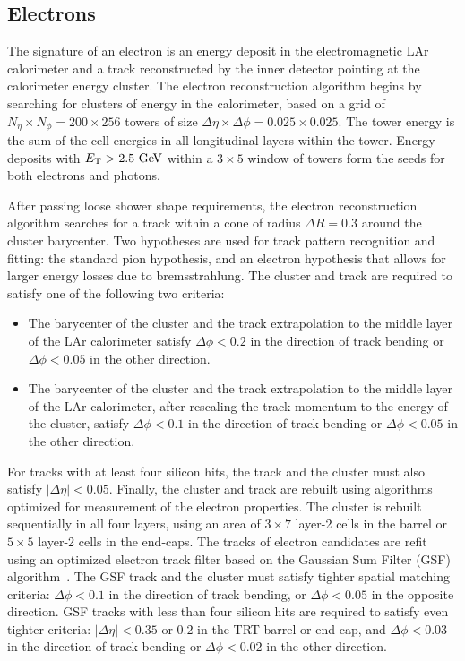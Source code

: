 \subsection{Electrons}\label{sec:event-reconstruction-electrons}
The signature of an electron is an energy deposit in the electromagnetic LAr calorimeter and a track reconstructed by the inner detector pointing at the calorimeter energy cluster.  The electron reconstruction algorithm begins by searching for clusters of energy in the calorimeter, based on a grid of $N_{\eta}\times N_{\phi}=200\times256$ towers of size $\Delta\eta\times\Delta\phi = 0.025\times0.025$. The tower energy is the sum of the cell energies in all longitudinal layers within the tower. Energy deposits with $\Et>2.5 \GeV$ within a $3\times 5$ window of towers form the seeds for both electrons and photons.

After passing loose shower shape requirements, the electron reconstruction algorithm searches for a track within a cone of radius $\Delta R=0.3$ around the cluster barycenter. Two hypotheses are used for track pattern recognition and fitting: the standard pion hypothesis, and an electron hypothesis that allows for larger energy losses due to bremsstrahlung. The cluster and track are required to satisfy one of the following two criteria:

\begin{itemize}
	\item The barycenter of the cluster and the track extrapolation to the middle layer of the LAr calorimeter satisfy $\Delta\phi<0.2$ in the direction of track bending or $\Delta\phi<0.05$ in the other direction. 
	\item The barycenter of the cluster and the track extrapolation to the middle layer of the LAr calorimeter, after rescaling the track momentum to the energy of the cluster, satisfy $\Delta\phi<0.1$ in the direction of track bending or $\Delta\phi<0.05$ in the other direction. 
\end{itemize}
 
For tracks with at least four silicon hits, the track and the cluster must also satisfy $|\Delta\eta|<0.05$. Finally, the cluster and track are rebuilt using algorithms optimized for measurement of the electron properties. The cluster is rebuilt sequentially in all four layers, using an area of $3\times7$ layer-2 cells in the barrel or $5\times5$ layer-2 cells in the end-caps. The tracks of electron candidates are refit using an optimized electron track filter based on the Gaussian Sum Filter (GSF) algorithm~\cite{gsf}. The GSF track and the cluster must satisfy tighter spatial matching criteria: $\Delta\phi<0.1$ in the direction of track bending, or $\Delta\phi<0.05$ in the opposite direction. GSF tracks with less than four silicon hits are required to satisfy even tighter criteria: $|\Delta\eta|<0.35$ or $0.2$ in the TRT barrel or end-cap, and $\Delta\phi<0.03$ in the direction of track bending or $\Delta\phi<0.02$ in the other direction. 


